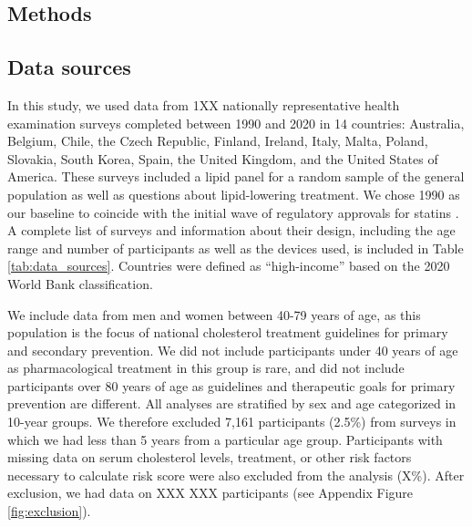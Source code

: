 \documentclass[12pt]{article}
\begin{document}
\begin{refsection}
\section{Methods} \label{sec:methods}
\subsection{Data sources}
In this study, we used data from 1XX nationally representative health examination surveys completed between 1990 and 2020 in 14 countries: Australia, Belgium, Chile, the Czech Republic, Finland, Ireland, Italy, Malta, Poland, Slovakia, South Korea, Spain, the United Kingdom, and the United States of America. These surveys included a lipid panel for a random sample of the general population as well as questions about lipid-lowering treatment. We chose 1990 as our baseline to coincide with the initial wave of regulatory approvals for statins \cite{tobert_lovastatin_2003}. A complete list of surveys and information about their design, including the age range and number of participants as well as the devices used, is included in Table \ref{tab:data_sources}. Countries were defined as ``high-income'' based on the 2020 World Bank classification.

We include data from men and women between 40-79 years of age, as this population is the focus of national cholesterol treatment guidelines for primary and secondary prevention. We did not include participants under 40 years of age as pharmacological treatment in this group is rare, and did not include participants over 80 years of age as guidelines and therapeutic goals for primary prevention are different. All analyses are stratified by sex and age categorized in 10-year groups. We therefore excluded 7,161 participants (2.5\%) from surveys in which we had less than 5 years from a particular age group. Participants with missing data on serum cholesterol levels, treatment, or other risk factors necessary to calculate risk score were also excluded from the analysis (X\%). After exclusion, we had data on XXX XXX participants (see Appendix Figure \ref{fig:exclusion}).


\end{refsection}
\end{document}
